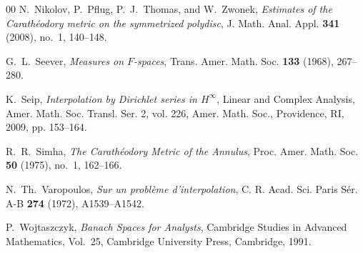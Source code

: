 \documentclass[preprint,12pt,number]{elsarticle}
\begin{document}
\begin{thebibliography}{00}
N.~Nikolov, P.~Pflug, P.~J.~Thomas, and W.~Zwonek,
\emph{Estimates of the Carath\'eodory metric on the symmetrized polydisc},
J. Math. Anal. Appl. \textbf{341} (2008), no.~1, 140--148.

G.~L.~Seever,
\textit{Measures on $F$-spaces},
Trans. Amer. Math. Soc. \textbf{133} (1968), 267--280.

K.~Seip, \emph{Interpolation by Dirichlet series in $H^\infty$}, Linear and Complex Analysis, Amer. Math. Soc. Transl. Ser. 2, vol. 226, Amer. Math. Soc., Providence, RI, 2009, pp. 153--164.

R.~R.~Simha,
\textit{The Carath\'eodory Metric of the Annulus},
Proc. Amer. Math. Soc. \textbf{50} (1975), no.~1, 162--166.

N.~Th.~Varopoulos,
\textit{Sur un problème d'interpolation},
C. R. Acad. Sci. Paris Sér. A-B \textbf{274} (1972), A1539--A1542.

P.~Wojtaszczyk,
\textit{Banach Spaces for Analysts},
Cambridge Studies in Advanced Mathematics, Vol.~25,
Cambridge University Press, Cambridge, 1991.
\end{thebibliography}
\end{document}
